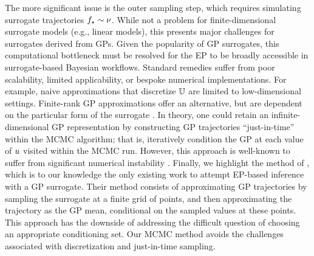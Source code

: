 \documentclass[12pt]{article}
\begin{document}
The more significant issue is the outer sampling step, which requires simulating surrogate 
trajectories ${f}_{\star} \sim \nu$. While not a problem for finite-dimensional 
surrogate models (e.g., linear models), this presents major challenges for surrogates 
derived from GPs. Given the popularity of GP surrogates, 
this computational bottleneck must be resolved for the EP to be broadly accessible in 
surrogate-based Bayesian workflows. Standard remedies suffer from poor scalability,
limited applicability, or bespoke numerical implementations. For example, naive 
approximations that discretize $\mathbb{U}$ are limited to low-dimensional settings.
Finite-rank GP approximations offer an alternative, but are dependent on the 
particular form of the surrogate \citep{pathwiseConditioning}. In theory, one 
could retain an infinite-dimensional GP representation by constructing 
GP trajectories ``just-in-time'' within the MCMC algorithm; that is, iteratively
condition the GP at each value of $u$ visited within the MCMC run.
However, this approach is well-known to suffer from significant numerical 
instability \citep{pathwiseConditioning}. Finally, we highlight the method of 
\citet{trainDynamics}, which is to our knowledge the only existing work to 
attempt EP-based inference with a GP surrogate. 
Their method consists of approximating GP 
trajectories by sampling the surrogate at a finite grid of points, 
and then approximating the trajectory as the GP mean, conditional on the 
sampled values at these points. This approach has the downside of 
addressing the difficult question of choosing an appropriate conditioning set.
Our MCMC method avoids the challenges associated with discretization
and just-in-time sampling.
\end{document}
